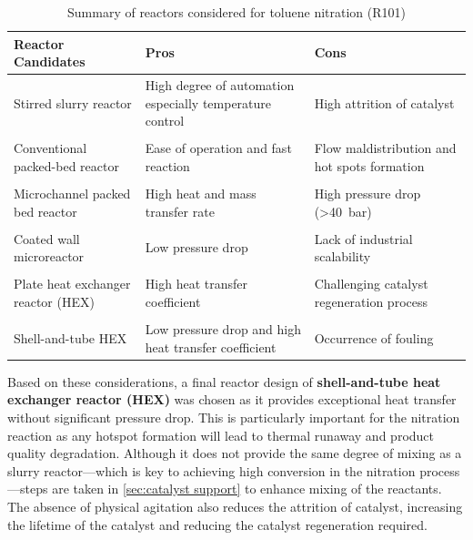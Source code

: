 \begin{table}[H]
\caption{Summary of reactors considered for toluene nitration (R101)}
\label{tab:reactorchoices}
\begin{tabularx}{\linewidth}{@{}lXX@{}}
\toprule
\textbf{Reactor Candidates}                 & \textbf{Pros}                                                                                               & \textbf{Cons}                                                                                    \\ \midrule
Stirred slurry reactor    & High degree of automation especially temperature control & High attrition of catalyst                                                              \\
\\
Conventional packed-bed reactor    & Ease of operation and fast reaction                                                                & Flow maldistribution and hot spots formation 
\\
\\
Microchannel packed bed reactor    & High heat and mass transfer rate                                                                   & High pressure drop (\SI{>40}{\bar})                                               \\
\\
Coated wall microreactor           & Low pressure drop                                                                                  & Lack of industrial scalability                                                          \\
\\
Plate heat exchanger reactor (HEX) & High heat transfer coefficient                                                                     & Challenging catalyst regeneration process     \\
\\
Shell-and-tube HEX                 & Low pressure drop and high heat transfer coefficient     & Occurrence of fouling                                                                                      \\ \bottomrule
\end{tabularx}
\end{table}

Based on these considerations, a final reactor design of \textbf{shell-and-tube heat exchanger reactor (HEX) }was chosen as it provides exceptional heat transfer without significant pressure drop. This is particularly important for the nitration reaction as any hotspot formation will lead to thermal runaway and product quality degradation. Although it does not provide the same degree of mixing as a slurry reactor---which is key to achieving high conversion in the nitration process---steps are taken in \cref{sec:catalyst support} to enhance mixing of the reactants. The absence of physical agitation also reduces the attrition of catalyst, increasing the lifetime of the catalyst and reducing the catalyst regeneration required.

